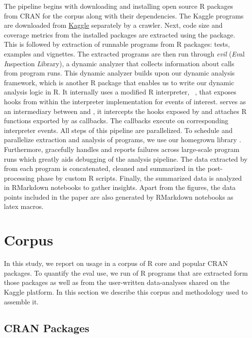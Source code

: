 \documentclass[conference]{IEEEtran}
\begin{document}
The pipeline begins with downloading and installing open source R packages from
CRAN for the corpus along with their dependencies. The Kaggle programs are
downloaded from \href{http://www.kaggle.com}{Kaggle} separately by a crawler.
Next, code size and coverage metrics from the installed packages are extracted
using the \href{ https://github.com/r-lib/covr}{\covr} package. This is followed
by extraction of runnable programs from R packages: tests, examples and
vignettes. The extracted programs are then run through \emph{evil} (\emph{Ev}al
\emph{I}nspection \emph{L}ibrary), a dynamic analyzer that collects information
about \eval calls from program runs. This dynamic analyzer builds upon our
dynamic analysis framework, \instrumentr which is another R package that enables
us to write our dynamic analysis logic in R. It internally uses a modified R
interpreter, \rdyntrace~\cite{oopsla19a}, that exposes hooks from within the
interpreter implementation for events of interest. \instrumentr serves as an
intermediary between \rdyntrace and \evil, it intercepts the hooks exposed by
\rdyntrace and attaches R functions exported by \evil as callbacks. The \evil
callbacks execute on corresponding interpreter events. All steps of this
pipeline are parallelized. To schedule and parallelize extraction and analysis
of programs, we use our homegrown library \runr. Furthermore, \runr gracefully
handles and reports failures across large-scale program runs which greatly aids
debugging of the analysis pipeline. The data extracted by \evil from each
program is concatenated, cleaned and summarized in the post-processing phase by
custom R scripts. Finally, the summarized data is analyzed in RMarkdown
notebooks to gather insights. Apart from the figures, the data points included
in the paper are also generated by RMarkdown notebooks as latex macros.

\section{Corpus}

In this study, we report on \eval usage in a corpus of \CorpusCorePackages R core
and \CorpusPackages popular CRAN packages. To quantify the eval use, we run
\CorpusAllProgramsRnd of R programs that are extracted form those packages as
well as from the user-written data-analyses shared on the Kaggle platform. In
this section we describe this corpus and methodology used to assemble it.

\subsection{CRAN Packages}
\end{document}
